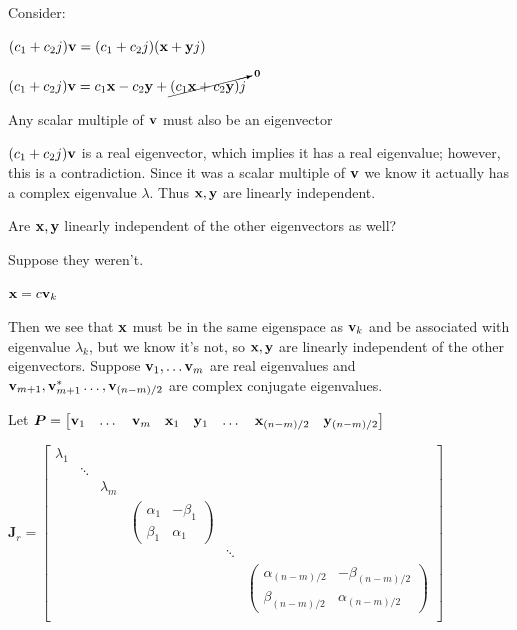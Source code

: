 \documentclass[11pt]{article}
\begin{document}
  Consider:

  \((c_1 + c_2j)\mathbf{v} = (c_1 + c_2j)(\mathbf{x} + \mathbf{y}j)\)

  \((c_1 + c_2j)\mathbf{v} = c_1\mathbf{x} - c_2\mathbf{y} + \cancelto{\mathbf{0}}{(c_1\mathbf{x} + c_2\mathbf{y})j}\)

  Any scalar multiple of \(\mathbf{v}\) must also be an eigenvector

  \((c_1 + c_2j)\mathbf{v}\) is a real eigenvector, which implies it has a real eigenvalue; however, this
  is a contradiction. Since it was a scalar multiple of \(\mathbf{v}\) we know it actually
  has a complex eigenvalue \(\lambda\). Thus \(\mathbf{x}, \mathbf{y}\) are linearly independent.

  Are \(\mathbf{x}, \mathbf{y}\) linearly independent of the other eigenvectors as well?

  Suppose they weren't.

  \(\mathbf{x} = c\mathbf{v}_k\)

  Then we see that \(\mathbf{x}\) must be in the same eigenspace as \(\mathbf{v}_k\) and be associated with
  eigenvalue \(\lambda_k\), but we know it's not, so \(\mathbf{x},\mathbf{y}\) are linearly
  independent of the other eigenvectors. Suppose \(\mathbf{v}_1, \dots \mathbf{v}_m\) are real
  eigenvalues and \(\mathbf{v}_{m + 1}, \mathbf{v}^*_{m + 1}\dots, \mathbf{v}_{(n - m) / 2}\) are complex conjugate eigenvalues.

  Let \(\bm{P} =
  \begin{bmatrix}
    \mathbf{v}_1 & \dots & \mathbf{v}_{m} & \mathbf{x}_1 & \mathbf{y}_1 & \dots & \mathbf{x}_{(n - m) / 2} & \mathbf{y}_{(n - m) / 2}
  \end{bmatrix}\)

  \(\bm{J}_r =
  \begin{bmatrix}
    \lambda_1 & \\
    & \ddots \\
    & & \lambda_m \\
    & & & \begin{pmatrix} \alpha_1 & - \beta_1 \\ \beta_1 & \alpha_1 \end{pmatrix}\\
    & & & & \ddots \\
    & & & & &
    \begin{pmatrix} \alpha_{(n - m) / 2} & - \beta_{(n - m) / 2} \\ \beta_{(n - m) / 2} & \alpha_{(n - m) / 2} \end{pmatrix}\\
  \end{bmatrix}\)
\end{document}
